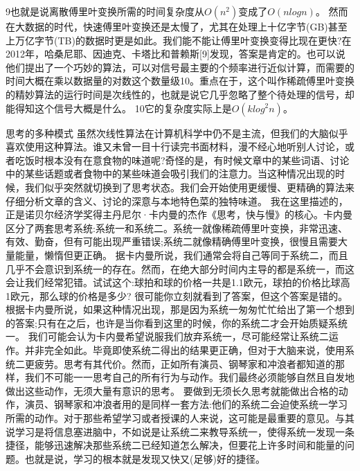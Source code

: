 9也就是说离散傅里叶变换所需的时间复杂度从$O(n^2)$变成了$O(nlogn)$。
然而在大数据的时代，快速傅里叶变换还是太慢了，尤其在处理上十亿字节(GB)甚至上万亿字节(TB)的数据时更是如此。我们能不能让傅里叶变换变得比现在更快?在2012年，哈桑尼耶、因迪克、卡塔比和普赖斯[9]发现，答案是肯定的。也可以说他们提出了一个巧妙的算法，可以对信号最主要的个频率进行近似计算，而需要的时间大概在乘以数据量的对数这个数量级10。重点在于，这个叫作稀疏傅里叶变换的精妙算法的运行时间是次线性的，也就是说它几乎忽略了整个待处理的信号，却能得知这个信号大概是什么。
10它的复杂度实际上是$O(klog^2n)$。

思考的多种模式
虽然次线性算法在计算机科学中仍不是主流，但我们的大脑似乎喜欢使用这种算法。谁又未曾一目十行读完书面材料，漫不经心地听别人讨论，或者吃饭时根本没有在意食物的味道呢?奇怪的是，有时候文章中的某些词语、讨论中的某些话题或者食物中的某些味道会吸引我们的注意力。当这种情况出现的时候，我们似乎突然就切换到了思考状态。我们会开始使用更缓慢、更精确的算法来仔细分析文章的含义、讨论的深意与本地特色菜的独特味道。
我在这里描述的，正是诺贝尔经济学奖得主丹尼尔·卡内曼的杰作《思考，快与慢》的核心。卡内曼区分了两套思考系统:系统一和系统二。系统一就像稀疏傅里叶变换，非常迅速、有效、勤奋，但有可能出现严重错误;系统二就像精确傅里叶变换，很慢且需要大量能量，懒惰但更正确。
据卡内曼所说，我们通常会将自己等同于系统二，而且几乎不会意识到系统一的存在。然而，在绝大部分时间内主导的都是系统一，而这会让我们经常犯错。试试这个:球拍和球的价格一共是1.1欧元，球拍的价格比球高1欧元，那么球的价格是多少?
很可能你立刻就看到了答案，但这个答案是错的。根据卡内曼所说，如果这种情况出现，那是因为系统一匆匆忙忙给出了第一个想到的答案;只有在之后，也许是当你看到这里的时候，你的系统二才会开始质疑系统一。
我们可能会认为卡内曼希望说服我们放弃系统一，尽可能经常让系统二运作。并非完全如此。毕竟即使系统二得出的结果更正确，但对于大脑来说，使用系统二更疲劳。思考有其代价。然而，正如所有演员、钢琴家和冲浪者都知道的那样，我们不可能一一思考自己的所有行为与动作。我们最终必须能够自然且自发地做出这些动作，无须大量有意识的思考。
要做到无须长久思考就能做出合格的动作，演员、钢琴家和冲浪者用的是同样一套方法:他们的系统二会迫使系统一学习所需的动作。对于那些希望学习或者授课的人来说，这可能是最重要的意见。与其说学习是将信息塞进脑中，不如说是让系统二来教导系统一，使得系统一发现一条捷径，能够迅速解决那些系统二已经知道怎么解决，但要花上许多时间和能量的问题。也就是说，学习的根本就是发现又快又(足够)好的捷径。

